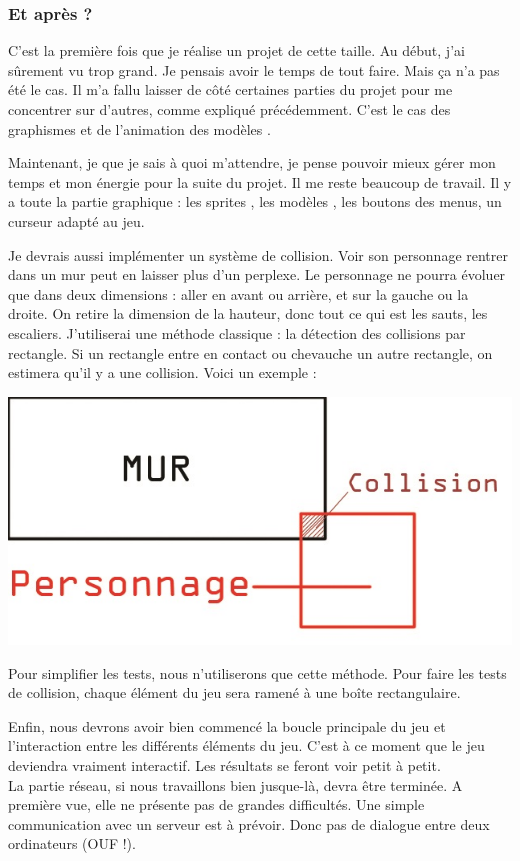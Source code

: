 \documentclass{article}
\begin{document}
\subsubsection{Et après ?}
\par
C'est la première fois que je réalise un projet de cette taille. Au début, j'ai sûrement vu trop grand. Je pensais avoir le temps de tout faire. Mais ça n'a pas été le cas. Il m'a fallu laisser de côté certaines parties du projet pour me concentrer sur d'autres, comme expliqué précédemment. C'est le cas des graphismes et de l'animation des modèles . 
\newline

\par
Maintenant, je que je sais à quoi m'attendre, je pense pouvoir mieux gérer mon temps et mon énergie pour la suite du projet. Il me reste beaucoup de travail. Il y a toute la partie graphique : les sprites , les modèles , les boutons des menus, un curseur adapté au jeu.


\par
Je devrais aussi implémenter un système de collision. Voir son personnage rentrer dans un mur peut en laisser plus d'un perplexe. Le personnage ne pourra évoluer que dans deux dimensions : aller en avant ou arrière, et sur la gauche ou la droite. On retire la dimension de la hauteur, donc tout ce qui est les sauts, les escaliers. J'utiliserai une méthode classique : la détection des collisions par rectangle. Si un rectangle entre en contact ou chevauche un autre rectangle, on estimera qu'il y a une collision. Voici un exemple : 

\begin{center}
\includegraphics[scale=0.5]{collision}
\end{center}

Pour simplifier les tests, nous n'utiliserons que cette méthode. Pour faire les tests de collision, chaque élément du jeu sera ramené à une boîte rectangulaire. \\
\par
Enfin, nous devrons avoir bien commencé la boucle principale du jeu et l'interaction entre les différents éléments du jeu. C'est à ce moment que le jeu deviendra vraiment interactif. Les résultats se feront voir petit à petit. 
\\
La partie réseau, si nous travaillons bien jusque-là, devra être terminée. A première vue, elle ne présente pas de grandes difficultés. Une simple communication avec un serveur est à prévoir. Donc pas de dialogue entre deux ordinateurs (OUF !).
\newpage
\end{document}
